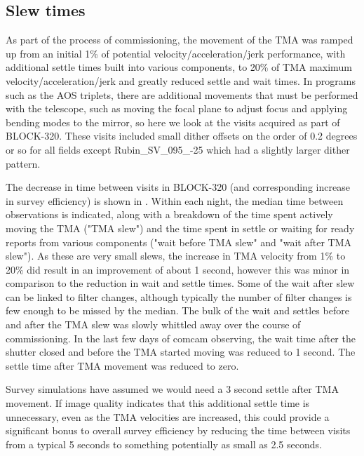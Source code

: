 \subsection{Slew times}

As part of the process of commissioning, the movement of the TMA was ramped up from an initial  1\% of potential velocity/acceleration/jerk performance, with additional settle times built into various components, to 20\% of TMA maximum velocity/acceleration/jerk and greatly reduced settle and wait times. In programs such as the AOS triplets, there are additional movements that must be performed with the telescope, such as moving the focal plane to adjust focus and applying bending modes to the mirror, so here we look at the visits acquired as part of BLOCK-320. These visits included small dither offsets on the order of 0.2 degrees or so for all fields except Rubin\_SV\_095\_-25 which had a slightly larger dither pattern. 

The decrease in time between visits in BLOCK-320 (and corresponding increase in survey efficiency) is shown in .  Within each night, the median time between observations is indicated, along with a breakdown of the time spent actively moving the TMA ("TMA slew") and the time spent in settle or waiting for ready reports from various components ("wait before TMA slew" and "wait after TMA slew"). As these are very small slews, the increase in TMA velocity from 1\% to 20\% did result in an improvement of about 1 second, however this was minor in comparison to the reduction in wait and settle times. Some of the wait after slew can be linked to filter changes, although typically the number of filter changes is few enough to be missed by the median. The bulk of the wait and settles before and after the TMA slew was slowly whittled away over the course of commissioning. In the last few days of comcam observing, the wait time after the shutter closed and before the TMA started moving was reduced to 1 second. The settle time after TMA movement was reduced to zero. 

Survey simulations have assumed we would need a 3 second settle after TMA movement. If image quality indicates that this additional settle time is unnecessary, even as the TMA velocities are increased, this could provide a significant bonus to overall survey efficiency by reducing the time between visits from a typical 5 seconds to something potentially as small as 2.5 seconds.


